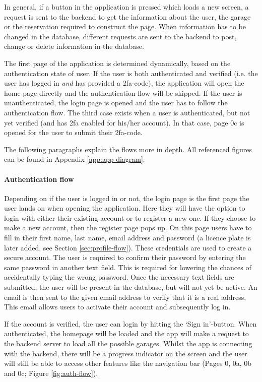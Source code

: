 \ind In general, if a button in the application is pressed which loads a new screen, a request is sent to the backend to get the information about the user, the garage or the reservation required to construct the page. When information has to be changed in the database, different requests are sent to the backend to post, change or delete information in the database. 

\ind The first page of the application is determined dynamically, based on the authentication state of user. If the user is both authenticated and verified (i.e. the user has logged in \textit{and} has provided a \ac{2fa}-code), the application will open the home page directly and the authentication flow will be skipped. If the user is unauthenticated, the login page is opened and the user has to follow the authentication flow. The third case exists when a user is authenticated, but not yet verified (and has \ac{2fa} enabled for his/her account). In that case, page 0c is opened for the user to submit their \ac{2fa}-code.

\ind The following paragraphs explain the flows more in depth. All referenced figures can be found in Appendix \ref{app:app-diagram}.

\paragraph{Authentication flow}
Depending on if the user is logged in or not, the login page is the first page the user lands on when opening the application. Here they will have the option to login with either their existing account or to register a new one. If they choose to make a new account, then the register page pops up. On this page users have to fill in their first name, last name, email address and password (a licence plate is later added, see Section \ref{sec:profile-flow}). These credentials are used to create a secure account. The user is required to confirm their password by entering the same password in another text field. This is required for lowering the chances of accidentally typing the wrong password. Once the necessary text fields are submitted, the user will be present in the database, but will not yet be active. An email is then sent to the given email address to verify that it is a real address. This email allows users to activate their account and subsequently log in.

\ind If the account is verified, the user can login by hitting the `Sign in'-button. When authenticated, the homepage will be loaded and the app will make a request to the backend server to load all the possible garages. Whilst the app is connecting with the backend, there will be a progress indicator on the screen and the user will still be able to access other features like the navigation bar (Pages 0, 0a, 0b and 0c; Figure \ref{fig:auth-flow}).


